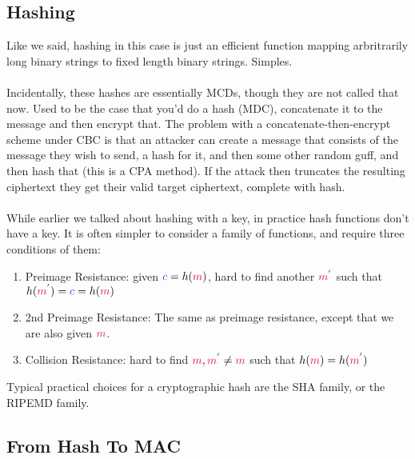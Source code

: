     \subsection{Hashing}
    Like we said, hashing in this case is just an efficient function mapping arbritrarily long binary strings to fixed length binary strings. Simples.\\
    \\
    Incidentally, these hashes are essentially MCDs, though they are not called that now. Used to be the case that you'd do a hash (MDC), concatenate it to the message and then encrypt that. The problem with a concatenate-then-encrypt scheme under CBC is that an attacker can create a message that consists of the message they wish to send, a hash for it, and then some other random guff, and then hash that (this is a CPA method). If the attack then truncates the resulting ciphertext they get their valid target ciphertext, complete with hash.\\
    \\
    While earlier we talked about hashing with a key, in practice hash functions don't have a key. It is often simpler to consider a family of functions, and require three conditions of them:
    \begin{enumerate}
        \item Preimage Resistance: given $\cc = h(\cm)$, hard to find another $\cm^{'}$ such that $h(\cm^{'}) = \cc = h(\cm)$
        \item 2nd Preimage Resistance: The same as preimage resistance, except that we are also given $\cm$.
        \item Collision Resistance: hard to find $\cm, \cm^{'} \neq \cm$ such that $h(\cm) = h(\cm^{'})$
    \end{enumerate}
    Typical practical choices for a cryptographic hash are the SHA family, or the RIPEMD family. %

    \subsection{From Hash To MAC}

